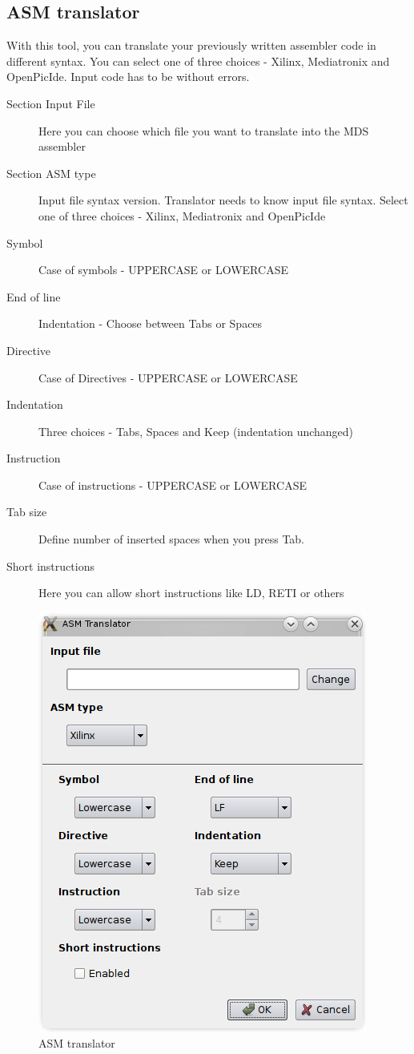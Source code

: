 \subsection{ASM translator}
    With this tool, you can translate your previously written assembler code in different syntax.
    You can select one of three choices - Xilinx, Mediatronix and OpenPicIde. Input code has to be without
    errors.
    \begin{description}
        \item[Section Input File] Here you can choose which file you want to translate into the MDS assembler
        \item[Section ASM type] Input file syntax version. Translator needs to know input file syntax. Select one of three choices - Xilinx, Mediatronix and OpenPicIde
        \item[Symbol] Case of symbols - UPPERCASE or LOWERCASE
        \item[End of line] Indentation - Choose between Tabs or Spaces
        \item[Directive] Case of Directives - UPPERCASE or LOWERCASE
        \item[Indentation] Three choices - Tabs, Spaces and Keep (indentation unchanged)
        \item[Instruction] Case of instructions - UPPERCASE or LOWERCASE
        \item[Tab size]  Define number of inserted spaces when you press Tab.
        \item[Short instructions] Here you can allow short instructions like LD, RETI or others
    \end{description}

    \begin{figure}[h]
        \centering{}
        \includegraphics[width=.5\textwidth]{img/ASM_translator.png}
        \caption{ASM translator}
    \end{figure}

